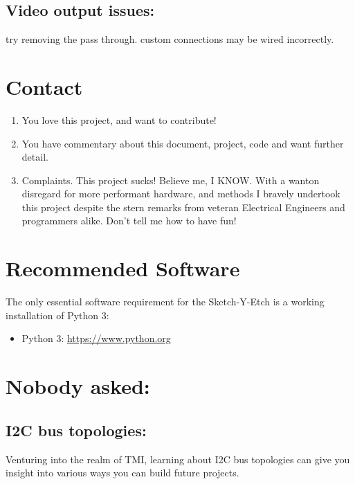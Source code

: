 \documentclass[]{article}
\begin{document}
\subsection{Video output issues:} try removing the pass through. custom connections may be wired incorrectly. \\

\section*{Contact}
\begin{enumerate}
\item You love this project, and want to contribute!
\item You have commentary about this document, project, code and want further detail.
\item Complaints. This project sucks! Believe me, I KNOW. With a wanton disregard for more performant hardware, and methods I bravely undertook this project despite the stern remarks from veteran Electrical Engineers and programmers alike. Don't tell me how to have fun!
\end{enumerate}



\section*{Recommended Software}

The only essential software requirement for the Sketch-Y-Etch is a working installation of Python 3:

\begin{itemize}
	\item Python 3: \url{https://www.python.org}
\end{itemize}

\section*{Nobody asked:}
\subsection{I2C bus topologies:}
Venturing into the realm of TMI, learning about I2C bus topologies can give you insight into various ways you can build future projects. 
\end{document}

